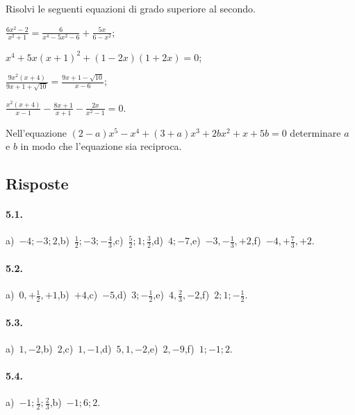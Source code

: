 \begin{esercizio}[\Ast] %
Risolvi le seguenti equazioni di grado superiore al secondo.
\begin{multicols}{2}
\begin{enumeratea}
\item $\frac{6x^2-2}{x^2+1}=\frac 6{x^4-5x^2-6}+\frac{5x}{6-x^2}$;
\item $x^4+5x(x+1)^2+(1-2x)(1+2x)=0$;
\item $\frac{9x^2(x+4)}{9x+1+\sqrt{10}}=\frac{9x+1-\sqrt{10}}{x-6}$;
\item $\frac{x^2(x+4)}{x-1}-\frac{8x+1}{x+1}-\frac{2x}{x^2-1}=0$.
\end{enumeratea}
\end{multicols}
\end{esercizio}

\begin{esercizio}[\Ast] %
Nell’equazione $(2-a)x^5-x^4+(3+a)x^3+2bx^2+x+5b=0$ determinare $a$ e $b$ in modo che l’equazione sia reciproca.
\end{esercizio}

\subsection{Risposte}
\paragraph{5.1.} a)~$-4;-3;2$,\quad b)~$\frac 1 2;-3;-\frac 4 3$,\quad c)~$\frac 5 2;1;\frac 3 2$,\quad d)~$4;-7$,\quad e)~$-3,-\frac 1 3,+2$,\quad f)~$-4,+\frac 7 3,+2$.

\paragraph{5.2.} a)~$0,+\frac 1 2,+1$,\quad b)~$+4$,\quad c)~$-5$,\quad d)~$3;-\frac 1 2$,\quad e)~$4,\frac 2 3,-2$,\quad f)~$2;1;-\frac 1 2$.

\paragraph{5.3.} a)~$1,-2$,\quad b)~$2$,\quad c)~$1,-1$,\quad d)~$5,1,-2$,\quad e)~$2,-9$,\quad f)~$1;-1;2$.

\paragraph{5.4.} a)~$-1;\frac 1 2;\frac 2 3$,\quad b)~$-1;6;2$.

